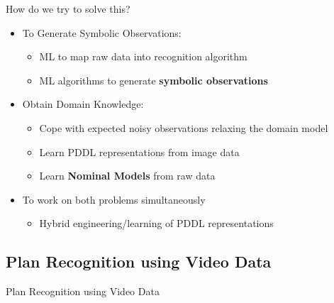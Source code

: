 \documentclass[usenames,dvipsnames]{beamer}
\begin{document}
%
%
%
%
%

\begin{frame}[c]{How do we try to solve this?}
	\begin{itemize}
		\item To Generate Symbolic Observations:
		\begin{itemize}
			\item ML to map raw data into recognition algorithm
			\item ML algorithms to generate \textbf{symbolic observations}
		\end{itemize}
		\item Obtain Domain Knowledge:
		\begin{itemize}
			\item Cope with expected noisy observations relaxing the domain model
			\item Learn PDDL representations from image data
			\item Learn \textbf{Nominal Models} from raw data
		\end{itemize}
		\item To work on both problems simultaneously
		\begin{itemize}
			\item Hybrid engineering/learning of PDDL representations 
		\end{itemize}
	\end{itemize}
\end{frame}

\subsection{Plan Recognition using Video Data}

\begin{frame}[c]
	\begin{center}
		\Large{Plan Recognition using Video Data}
	\end{center}
\end{frame}
\end{document}
